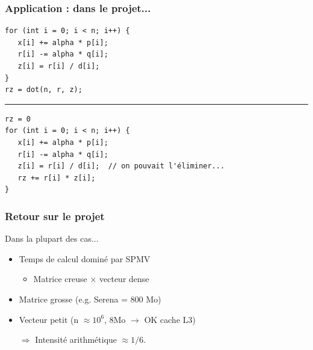 \documentclass[xcolor={x11names,svgnames}, 14pt]{beamer}
\begin{document}

\begin{frame}[fragile]
  \frametitle{Application : dans le projet...}

\begin{verbatim}
for (int i = 0; i < n; i++) {
   x[i] += alpha * p[i];
   r[i] -= alpha * q[i];
   z[i] = r[i] / d[i];
}
rz = dot(n, r, z);
\end{verbatim}

  \medskip
  \hrule
  \medskip

\begin{verbatim}
rz = 0
for (int i = 0; i < n; i++) {
   x[i] += alpha * p[i];
   r[i] -= alpha * q[i];
   z[i] = r[i] / d[i];  // on pouvait l'éliminer...
   rz += r[i] * z[i];
}
\end{verbatim}

\end{frame}


\begin{frame}
  \frametitle{Retour sur le projet}

  \begin{alertblock}{Dans la plupart des cas...}
    \begin{itemize}      
    \item Temps de calcul dominé par SPMV
      \begin{itemize}
      \item Matrice creuse $\times$ vecteur dense
      \end{itemize}
    \item Matrice grosse (e.g. Serena = 800 Mo)
    \item Vecteur petit (n $\approx 10^6$, 8Mo $\rightarrow$ OK cache L3)
    \item[$\Rightarrow$] Intensité arithmétique $\approx 1/6$.
    \end{itemize}
  \end{alertblock}
\end{frame}

\end{document}
